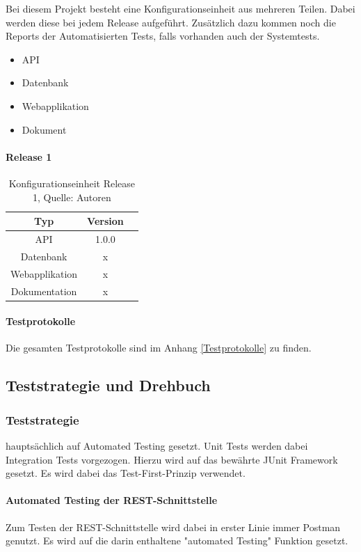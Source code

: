Bei diesem Projekt besteht eine Konfigurationseinheit aus mehreren Teilen. Dabei werden diese bei jedem Release aufgeführt. Zusätzlich dazu kommen noch die Reports der Automatisierten Tests, falls vorhanden auch der Systemtests.
\begin{itemize}
\item API
\item Datenbank
\item Webapplikation
\item Dokument
\end{itemize}
\paragraph{Release 1}

\begin{table}[H]
\setlength\extrarowheight{2pt} %
\begin{tabularx}{\textwidth}{|C|C|C|}
\hline
\textbf{Typ} &  \textbf{Version}  \\

\hline
API &  1.0.0\\
\hline
Datenbank &  x\\
\hline
Webapplikation  & x\\
\hline
Dokumentation & x\\
\hline
\end{tabularx}
\caption{ \label{tbl: Konfigurationseinheit Release 1}Konfigurationseinheit Release 1, Quelle: Autoren}
\end{table}

\paragraph{Testprotokolle}
Die gesamten Testprotokolle sind im Anhang \ref{Testprotokolle} zu finden. 
\newpage
\subsection{Teststrategie und Drehbuch}
\subsubsection{Teststrategie}
hauptsächlich auf Automated Testing gesetzt.
Unit Tests werden dabei Integration Tests vorgezogen.
Hierzu wird auf das bewährte JUnit Framework gesetzt.
Es wird dabei das Test-First-Prinzip verwendet.

\paragraph{Automated Testing der REST-Schnittstelle}
Zum Testen der REST-Schnittstelle wird dabei in erster Linie immer Postman genutzt. Es wird auf die darin enthaltene "automated Testing" Funktion gesetzt. 

